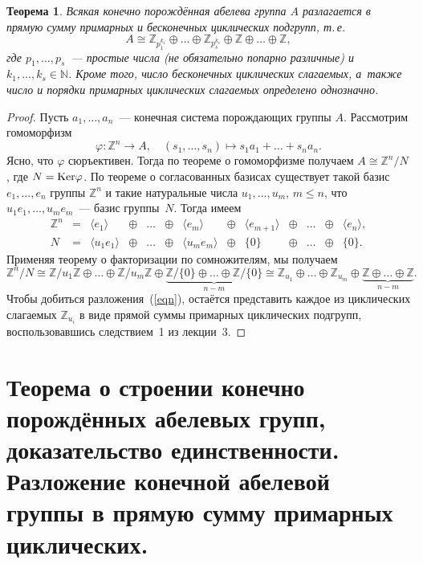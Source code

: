 \documentclass[a4paper, 12pt]{article}
\def\Ker{{\rm Ker}}%
\def\ZZ{{\mathbb Z}}%
\def\NN{{\mathbb N}}%
\newtheorem{theorem}{Теорема}
\theoremstyle{definition}
\theoremstyle{remark}
\begin{document}
\begin{theorem} \label{traz}
Всякая конечно порождённая абелева группа $A$ разлагается в прямую
сумму примарных и бесконечных циклических подгрупп, т.\,е.
\begin{equation} \label{eqn}
A \cong \ZZ_{p_1^{k_1}} \oplus \ldots \oplus \ZZ_{p_s^{k_s}} \oplus
\ZZ \oplus \ldots \oplus \ZZ,
\end{equation}
где $p_1, \ldots, p_s$~--- простые числа \textup(не обязательно
попарно различные\textup) и $k_1, \ldots, k_s \in \NN$. Кроме того,
число бесконечных циклических слагаемых, а~также число и порядки
примарных циклических слагаемых определено однозначно.
\end{theorem}

\begin{proof}
Пусть $a_1,\ldots,a_n$~--- конечная система порождающих группы $A$.
Рассмотрим гомоморфизм
$$
\varphi \colon \ZZ^n \to A, \quad (s_1, \ldots, s_n) \mapsto s_1 a_1
+ \ldots + s_n a_n.
$$
Ясно, что $\varphi$ сюръективен. Тогда по теореме о гомоморфизме
получаем $A \cong \ZZ^n / N$, где $N = \Ker \varphi$. По теореме о
согласованных базисах существует такой базис $e_1, \ldots, e_n$
группы $\ZZ^n$ и такие натуральные числа $u_1, \ldots, u_m$, $m
\leqslant n$, что $u_1 e_1, \ldots, u_m e_m$~--- базис группы~$N$.
Тогда имеем
$$
\begin{array}{ccccccccccccc}
\ZZ^n &=& \langle e_1 \rangle &\oplus & \ldots & \oplus & \langle e_m
\rangle & \oplus & \langle e_{m+1} \rangle & \oplus & \ldots &
\oplus & \langle e_n \rangle, \\
N &=& \langle u_1e_1 \rangle & \oplus & \ldots & \oplus & \langle
u_m e_m \rangle &\oplus & \lbrace 0 \rbrace & \oplus & \ldots &
\oplus & \lbrace 0 \rbrace.
\end{array}
$$
Применяя теорему о факторизации по сомножителям, мы получаем
$$
\ZZ^n / N \cong \ZZ / u_1 \ZZ \oplus \ldots \oplus \ZZ / u_m \ZZ
\oplus \underbrace{\ZZ / \lbrace 0 \rbrace \oplus \ldots \oplus \ZZ
/ \lbrace 0 \rbrace}_{n-m} \cong \ZZ_{u_1} \oplus \ldots \oplus
\ZZ_{u_m} \oplus \underbrace{\ZZ \oplus \ldots \oplus \ZZ}_{n-m}.
$$
Чтобы добиться разложения~(\ref{eqn}), остаётся представить каждое
из циклических слагаемых $\ZZ_{u_i}$ в виде прямой суммы примарных
циклических подгрупп, воспользовавшись следствием~1 из лекции~3.

\end{proof}


\section{Теорема о строении конечно порождённых абелевых групп, доказательство единственности. Разложение конечной абелевой группы в прямую сумму примарных циклических.}
\end{document}
